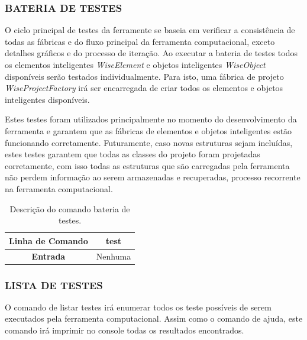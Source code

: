 \documentclass[a4paper,12pt]{monografia}
\theoremstyle{plain}
\theoremstyle{definition}
\theoremstyle{remark}
\begin{document}
\subsubsection{BATERIA DE TESTES}\label{sec:test}

O ciclo principal de testes da ferramente se baseia em verificar a consistência de todas as fábricas e do fluxo principal da ferramenta computacional, exceto detalhes gráficos e do processo de iteração. Ao executar a bateria de testes todos os elementos inteligentes \textit{WiseElement} e objetos inteligentes \textit{WiseObject} disponíveis serão testados individualmente. Para isto, uma fábrica de projeto \textit{WiseProjectFactory} irá ser encarregada de criar todos os elementos e objetos inteligentes disponíveis.

Estes testes foram utilizados principalmente no momento do desenvolvimento da ferramenta e garantem que as fábricas de elementos e objetos inteligentes estão funcionando corretamente. Futuramente, caso novas estruturas sejam incluídas, estes testes garantem que todas as classes do projeto foram projetadas corretamente, com isso todas as estruturas que são carregadas pela ferramenta não perdem informação ao serem armazenadas e recuperadas, processo recorrente na ferramenta computacional.

\begin{center}
	\begin{table}[!htbp]
		\begin{tabular}{|c|m{}|}
			\hline
			\textbf{Linha de Comando} & \multicolumn{1}{c|}{test} \\
			\hline
			\textbf{Entrada} & Nenhuma \\
			\hline
		\end{tabular}
	\caption{Descrição do comando bateria de testes.}
	\label{tab:test}
	\end{table}
\end{center}

\subsubsection{LISTA DE TESTES}\label{sec:test list}

O comando de listar testes irá enumerar todos os teste possíveis de serem executados pela ferramenta computacional. Assim como o comando de ajuda, este comando irá imprimir no console todas os resultados encontrados. 
\end{document}

